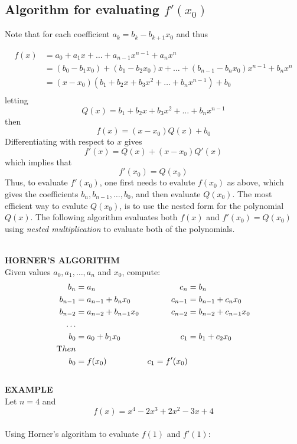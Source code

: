 \documentclass [titlepage,12pt,letter] {article}
\begin{document}
\subsection{Algorithm for evaluating $f'(x_0)$} 

Note that for each coefficient $a_k=b_k-b_{k+1}x_0$ and thus 

\begin{align*} 
 f(x) &=a_0 + a_1 x + \dots + a_{n-1} x^{n-1} + a_n x^{n}  \\ 
&= (b_{0} - b_{1}x_{0}) + (b_{1} - b_{2}x_{0})x + \dots + (b_{n-1} - b_nx_0)x^{n-1} + b_nx^{n}   \\ 
&= (x-x_0) (b_1 + b_2x + b_3 x^2 + \dots + b_n x^{n-1}) + b_0   \\ 
\end{align*} 
letting
\[
Q(x) = b_1 + b_2x + b_3 x^2 + \dots + b_n x^{n-1} 
\]
\noindent 
then 
\[
f(x)= (x-x_0)Q(x) + b_0  
\]
\noindent 
Differentiating with respect to $x$ gives 
\[ 
f'(x) = Q(x) + (x-x_0) Q'(x) 
\] 
\noindent 
which implies that 
\[
f'(x_0) = Q(x_0) 
\]
\noindent 
Thus, to evaluate $f'(x_0)$, one first needs to evalute $f(x_0)$ as above, which gives the coefficients $b_n, b_{n-1}, \dots, b_0$, and then evaluate $Q(x_0)$. The most efficient way to evalute $Q(x_0)$, is to use the nested form for the polynomial $Q(x)$. The following algorithm evaluates both $f(x)$ and $f'(x_0)= Q(x_0)$ using {\it nested multiplication} to evaluate both of the polynomials. 

\noindent 
\\
{\bf HORNER'S ALGORITHM} 
\\
Given values $a_0, a_1, \dots, a_n$ and $x_0$, compute: 
\begin{align*} 
b_n &= a_n &  c_n &= b_n \\ 
b_{n-1} &= a_{n-1} + b_{n} x_0 & c_{n-1} &= b_{n-1} + c_n x_0 \\ 
b_{n-2} &= a_{n-2} + b_{n-1} x_0 & c_{n-2} &= b_{n-2} + c_{n-1} x_0 \\ 
\dots \\ 
b_{0} &= a_{0} + b_{1} x_0 & c_{1} &= b_{1} + c_{2} x_{0} \\ 
{\mbox Then } \\ 
b_0 &= f(x_0) & c_1 = f'(x_0) \\  
\end{align*} 
\\ 
{\bf EXAMPLE} 
\\ 
Let $n=4$ and 
\[
f(x) = x^4 - 2 x^3 + 2 x^2 -3x + 4 
\]
\\ 
\noindent 
Using Horner's algorithm to evaluate $f(1)$ and $f'(1)$: 
\end{document}
